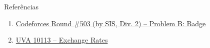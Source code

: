 \begin{frame}[fragile]{Referências}

    \begin{enumerate}
        \item \href{https://codeforces.com/problemset/problem/1020/B}{Codeforces Round \#503 (by SIS, Div. 2) -- Problem B: Badge}

        \item \href{https://uva.onlinejudge.org/index.php?option=com_onlinejudge&Itemid=8&category=24&page=show_problem&problem=1054}{UVA 10113 -- Exchange Rates}
    \end{enumerate}

\end{frame}
